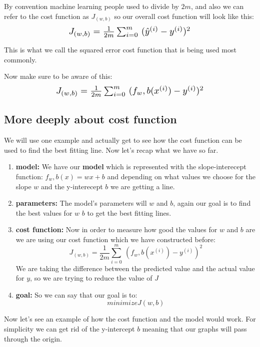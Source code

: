 By convention machine learning people used to divide by $2m$, and also we can refer to the cost function as $J_(w,b)$ so our overall cost function will look like this:
\begin{align*}
  \scalebox{1.3}{$
    J_{(w,b)}=\frac{1}{2m}\sum_{i=0}^{m}\ (\hat{y}^{(i)}-y^{(i)})^2
  $}
\end{align*}

This is what we call the squared error cost function that is being used most commonly.

Now make sure to be aware of this:
\begin{align*}
  \scalebox{1.3}{$
    J_{(w,b)}=\frac{1}{2m}\sum_{i=0}^{m}\ (f_w,b(x^{(i)})-y^{(i)})^2
  $}
\end{align*}

\subsection{More deeply about cost function}
We will use one example and actually get to see how the cost function can be used to find the best fitting line.
Now let's recap what we have so far.
\begin{enumerate}
  \item \textbf{model:} We have our \textbf{model} which is represented with the slope-interecept function: $f_w,b(x)=wx+b$ and depending on what values we choose for the slope $w$ and the y-interecept $b$ we are getting a line.
  \item  \textbf{parameters:} The model's parameters will $w$ and $b$, again our goal is to find the best values for $w$ $b$ to get the best fitting lines.
  \item \textbf{cost function:} Now in order to measure how good the values for $w$ and $b$ are we are using our cost function which we have constructed before: $$ J_{(w,b)}=\frac{1}{2m}\sum_{i=0}^{m}\ (f_w,b(x^{(i)})-y^{(i)})^2 $$
        We are taking the difference between the predicted value and the actual value for $y$, so we are trying to reduce the value of $J$
  \item \textbf{goal: } So we can say that our goal is to: $$ minimize J(w,b)$$
\end{enumerate}

Now let's see an example of how the cost function and the model would work.
For simplicity we can get rid of the y-intercept $b$ meaning that our graphs will pass through the origin.

